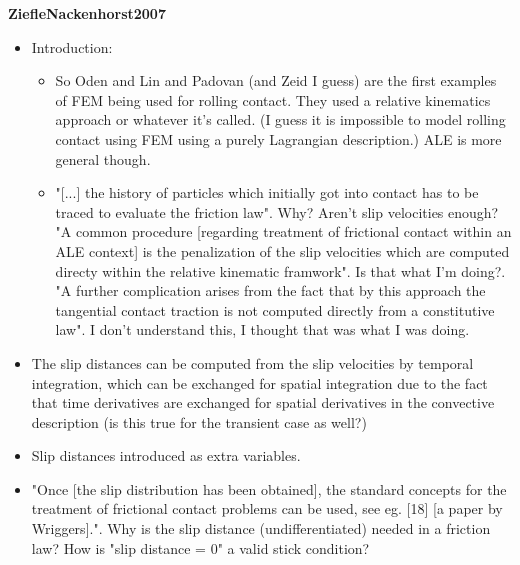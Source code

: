 \documentclass{article}
\begin{document}
\textbf{ZiefleNackenhorst2007}
\begin{itemize}
\item Introduction:
\begin{itemize}
\item So Oden and Lin and Padovan (and Zeid I guess) are the first examples of FEM being used for rolling contact. They used a relative kinematics approach or whatever it's called. (I guess it is impossible to model rolling contact using FEM using a purely Lagrangian description.) ALE is more general though.
\item "[...] the history of particles which initially got into contact has to be traced to evaluate the friction law". Why? Aren't slip velocities enough? "A common procedure [regarding treatment of frictional contact within an ALE context] is the penalization of the slip velocities which are computed directy within the relative kinematic framwork". Is that what I'm doing?. "A further complication arises from the fact that by this approach the tangential contact traction is not computed directly from a constitutive law". I don't understand this, I thought that was what I was doing.
\end{itemize}
\item The slip distances can be computed from the slip velocities by temporal integration, which can be exchanged for spatial integration due to the fact that time derivatives are exchanged for spatial derivatives in the convective description (is this true for the transient case as well?)
\item Slip distances introduced as extra variables.
\item "Once [the slip distribution has been obtained], the standard concepts for the treatment of frictional contact problems can be used, see eg. [18] [a paper by Wriggers].". Why is the slip distance (undifferentiated) needed in a friction law? How is "slip distance = 0" a valid stick condition?
\end{itemize}
\end{document}
